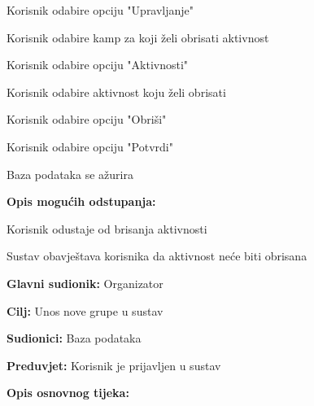\begin{packed_item}
\begin{packed_item}
						\item[] \begin{packed_enum}
							
							\item Korisnik odabire opciju "Upravljanje"
							\item Korisnik odabire kamp za koji želi obrisati aktivnost
							\item Korisnik odabire opciju "Aktivnosti"
							\item Korisnik odabire aktivnost koju želi obrisati
							\item Korisnik odabire opciju "Obriši"
							\item Korisnik odabire opciju "Potvrdi"
							\item Baza podataka se ažurira
						\end{packed_enum}
						
						\item  \textbf{Opis mogućih odstupanja:}
						
						\item[] \begin{packed_item}
							
							\item[3.a] Korisnik odustaje od brisanja aktivnosti
							\item[] \begin{packed_enum}
								
								\item Sustav obavještava korisnika da aktivnost neće biti obrisana	
								
							\end{packed_enum}
							
							
						\end{packed_item}
					\end{packed_item}
					
					\noindent \underbar{\textbf{UC24 - Unos grupe}}
					\begin{packed_item}
						
						\item \textbf{Glavni sudionik: }Organizator
						\item  \textbf{Cilj:} Unos nove grupe u sustav
						\item  \textbf{Sudionici:} Baza podataka
						\item  \textbf{Preduvjet:} Korisnik je prijavljen u sustav
						\item  \textbf{Opis osnovnog tijeka:}
						

\end{packed_item}
\end{packed_item}
